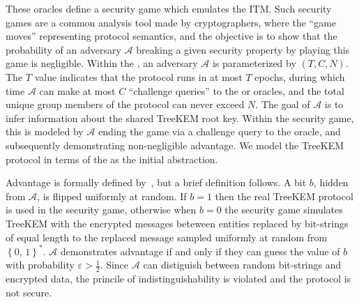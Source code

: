 \documentclass[runningheads]{llncs}
\newcommand{\Abrev}[1]{\gls{#1}}
\newcommand{\Adversary}{\ensuremath{\mathcal{A}}\xspace}
\begin{document}
These oracles define a security game \cite{shoup2004sequences} which emulates the \Abrev{ITM}.
Such security games are a common analysis tool made by cryptographers, where the ``game moves'' representing protocol semantics, and the objective is to show that the probability of an adversary \Adversary  breaking a given security property by playing this game is negligible.
Within the \CGKAsec, an adversary \Adversary is parameterized by \((T, C, N)\).
The \(T\) value indicates that the protocol runs in at most \(T\) epochs, during which time \(\mathcal{A}\) can make at most \(C\) ``challenge queries'' to the  or  oracles, and the total unique group members of the protocol can never exceed \(N\).
The goal of \Adversary is to infer information about the shared TreeKEM root key.
Within the security game, this is modeled by \Adversary  ending the game via a challenge query to the  oracle, 
and subsequently demonstrating non-negligible advantage.
We model the TreeKEM protocol in terms of the \CGKAsec as the initial abstraction.

Advantage is formally defined by~\cite{alwen2020security}, but a brief definition follows.
A bit $b$, hidden from \Adversary, is flipped uniformly at random.
If $b = 1$ then the real TreeKEM protocol is used in the security game, otherwise when $b = 0$ the security game simulates TreeKEM with the encrypted messages beteween entities replaced by bit-strings of equal length to the replaced message sampled uniformly at random from $\left\{0,\,1\right\}^{\ast}$.
 \Adversary demonstrates advantage if and only if they can guess the value of $b$ with probability $\varepsilon > \frac{1}{2}$.
Since \Adversary can distiguish between random bit-strings and encrypted data, the princile of indistinguishability is violated and the protocol is not secure.


\end{document}
